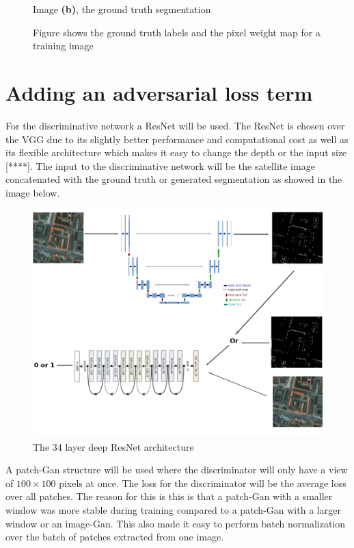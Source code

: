 \documentclass{kththesis}
\begin{document}
\begin{figure}[H]
  Image \textbf{(b)}, the ground truth segmentation
\endminipage\hfill
\caption{Figure shows the ground truth labels and the pixel weight map for a training image}
\end{figure}
\section{Adding an adversarial loss term}
For the discriminative network a ResNet will be used. The ResNet is chosen over the VGG due to its slightly better performance and computational cost as well as its flexible architecture which makes it easy to change the depth or the input size [****]. The input to the discriminative network will be the satellite image concatenated with the ground truth or generated segmentation as showed in the image below. 
\begin{figure}[H]
  \centering
      \includegraphics[scale=0.25]{gan_no_n}
  \caption{The 34 layer deep ResNet architecture \parencite{simonyan_very_2014}} \label{fig:vgg}
\end{figure}
A patch-Gan structure will be used where the discriminator will only have a view of $100 \times 100$ pixels at once. The loss for the discriminator will be the average loss over all patches. The reason for this is this is that a patch-Gan with a smaller window was more stable during training compared to a patch-Gan with a larger window or an image-Gan. This also made it easy to perform batch normalization over the batch of patches extracted from one image.\\
\\
\end{document}
